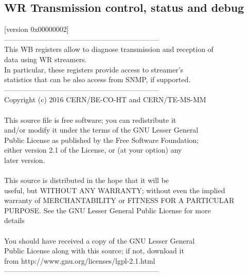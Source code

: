 \subsection{WR Transmission control, status and debug}
\label{subsec:wbgen:wr_streamers}
[version 0x00000002]\\
-----------------------------------------------------------------\\  This WB registers allow to diagnose transmission and reception of\\  data using WR streamers.                                         \\  In particular, these registers provide access to streamer's      \\  statistics that can be also access from SNMP, if supported.      \\  -----------------------------------------------------------------\\  Copyright (c) 2016 CERN/BE-CO-HT and CERN/TE-MS-MM               \\                                                                   \\  This source file is free software; you can redistribute it       \\  and/or modify it under the terms of the GNU Lesser General       \\  Public License as published by the Free Software Foundation;     \\  either version 2.1 of the License, or (at your option) any       \\  later version.                                                   \\                                                                   \\  This source is distributed in the hope that it will be           \\  useful, but WITHOUT ANY WARRANTY; without even the implied       \\  warranty of MERCHANTABILITY or FITNESS FOR A PARTICULAR          \\  PURPOSE.  See the GNU Lesser General Public License for more     \\  details                                                          \\                                                                   \\  You should have received a copy of the GNU Lesser General        \\  Public License along with this source; if not, download it       \\  from http://www.gnu.org/licenses/lgpl-2.1.html                   \\  -----------------------------------------------------------------
